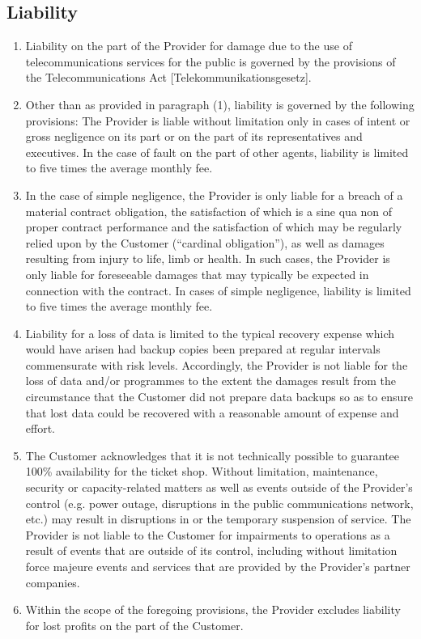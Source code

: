 \documentclass{terms}
\begin{document}
\subsection{Liability}
\begin{enumerate}
\item Liability on the part of the Provider for damage due to the use of telecommunications services for the public is governed by the provisions of the Telecommunications Act [Telekommunikationsgesetz].
\item Other than as provided in paragraph (1), liability is governed by the following provisions: The Provider is liable without limitation only in cases of intent or gross negligence on its part or on the part of its representatives and executives. In the case of fault on the part of other agents, liability is limited to five times the average monthly fee.
\item In the case of simple negligence, the Provider is only liable for a breach of a material contract obligation, the satisfaction of which is a sine qua non of proper contract performance and the satisfaction of which may be regularly relied upon by the Customer (“cardinal obligation”), as well as damages resulting from injury to life, limb or health. In such cases, the Provider is only liable for foreseeable damages that may typically be expected in connection with the contract. In cases of simple negligence, liability is limited to five times the average monthly fee.
\item Liability for a loss of data is limited to the typical recovery expense which would have arisen had backup copies been prepared at regular intervals commensurate with risk levels. Accordingly, the Provider is not liable for the loss of data and/or programmes to the extent the damages result from the circumstance that the Customer did not prepare data backups so as to ensure that lost data could be recovered with a reasonable amount of expense and effort.
\item The Customer acknowledges that it is not technically possible to guarantee 100\% availability for the ticket shop. Without limitation, maintenance, security or capacity-related matters as well as events outside of the Provider's control (e.g. power outage, disruptions in the public communications network, etc.) may result in disruptions in or the temporary suspension of service. The Provider is not liable to the Customer for impairments to operations as a result of events that are outside of its control, including without limitation force majeure events and services that are provided by the Provider's partner companies.
\item Within the scope of the foregoing provisions, the Provider excludes liability for lost profits on the part of the Customer.
\end{enumerate}
\end{document}
